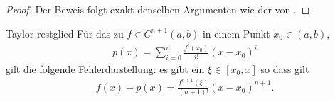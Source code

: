 \begin{proof}
  Der Beweis folgt exakt denselben Argumenten wie der von
  .
\end{proof}

\begin{Korollar}{Taylor-restglied}
  Für das  zu $f\in C^{n+1}(a,b)$ in einem
  Punkt $x_0\in(a,b)$,
  \begin{gather}
    p(x) = \sum_{i=0}^n \frac{f^{i}(x_0)}{i!} (x-x_0)^i
  \end{gather}
  gilt die folgende Fehlerdarstellung: es gibt ein $\xi\in[x_0,x]$ so dass gilt
  \begin{gather}
    f(x) - p(x) = \frac{f^{n+1}(\xi)}{(n+1)!} (x-x_0)^{n+1}.
  \end{gather}
\end{Korollar}

